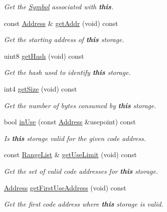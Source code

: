\begin{DoxyCompactItemize}
\begin{DoxyCompactList}\small\item\em Get the \mbox{\hyperlink{class_symbol}{Symbol}} associated with {\bfseries{this}}. \end{DoxyCompactList}\item 
const \mbox{\hyperlink{class_address}{Address}} \& \mbox{\hyperlink{class_symbol_entry_ae4bfe9ecfa78228978b247479554db80}{get\+Addr}} (void) const
\begin{DoxyCompactList}\small\item\em Get the starting address of {\bfseries{this}} storage. \end{DoxyCompactList}\item 
uint8 \mbox{\hyperlink{class_symbol_entry_a1ed6804fa8944007d6e0685432dced73}{get\+Hash}} (void) const
\begin{DoxyCompactList}\small\item\em Get the hash used to identify {\bfseries{this}} storage. \end{DoxyCompactList}\item 
int4 \mbox{\hyperlink{class_symbol_entry_aced6757088dfc0497320dd6750aedf04}{get\+Size}} (void) const
\begin{DoxyCompactList}\small\item\em Get the number of bytes consumed by {\bfseries{this}} storage. \end{DoxyCompactList}\item 
bool \mbox{\hyperlink{class_symbol_entry_a389ffcfb36cee3c49b63fdac6be92bee}{in\+Use}} (const \mbox{\hyperlink{class_address}{Address}} \&usepoint) const
\begin{DoxyCompactList}\small\item\em Is {\bfseries{this}} storage valid for the given code address. \end{DoxyCompactList}\item 
const \mbox{\hyperlink{class_range_list}{Range\+List}} \& \mbox{\hyperlink{class_symbol_entry_acb15ad9276468db4b74b86556dfb1028}{get\+Use\+Limit}} (void) const
\begin{DoxyCompactList}\small\item\em Get the set of valid code addresses for {\bfseries{this}} storage. \end{DoxyCompactList}\item 
\mbox{\hyperlink{class_address}{Address}} \mbox{\hyperlink{class_symbol_entry_a856e7005f430c40b54c97ee886476e8a}{get\+First\+Use\+Address}} (void) const
\begin{DoxyCompactList}\small\item\em Get the first code address where {\bfseries{this}} storage is valid. \end{DoxyCompactList}\item 

\end{DoxyCompactItemize}
